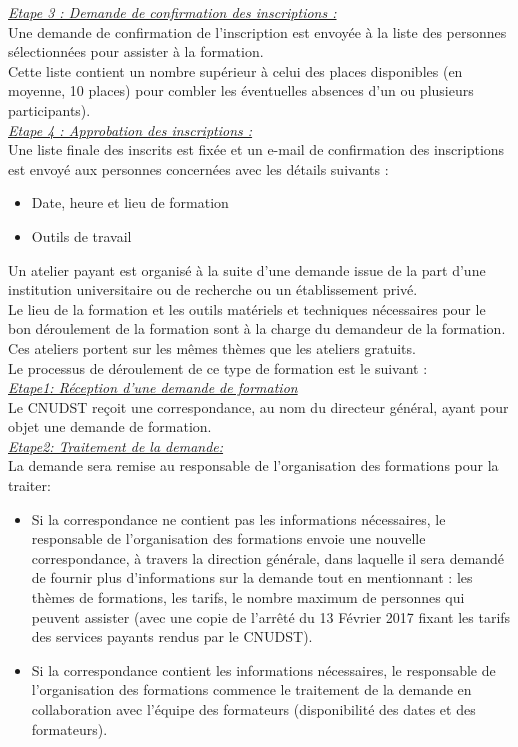 \underline{\textit{Etape 3 : Demande de confirmation des inscriptions :}}\\
Une demande de confirmation de l’inscription est envoyée à la liste des personnes
sélectionnées pour assister à la formation.\\
Cette liste contient un nombre
supérieur à celui des places disponibles (en moyenne, 10 places) pour combler les
éventuelles absences d’un ou plusieurs participants).\\
\underline{\textit{Etape 4 : Approbation des inscriptions :}}\\
Une liste finale des inscrits est fixée et un e-mail de confirmation des inscriptions
est envoyé aux personnes concernées avec les détails suivants :
\begin{itemize}
	\item Date, heure et lieu de formation
	\item Outils de travail
\end{itemize}
Un atelier payant est organisé à la suite d’une demande issue de la part d’une institution
universitaire ou de recherche ou un établissement privé.\\
Le lieu de la formation et les outils matériels et techniques nécessaires pour le bon
déroulement de la formation sont à la charge du demandeur de la formation.\\ Ces ateliers
portent sur les mêmes thèmes que les ateliers gratuits.\\
Le processus de déroulement de ce type de formation est le suivant :\\
\underline{\textit{Etape1: Réception d’une demande de formation}}\\
Le CNUDST reçoit une correspondance, au nom du directeur général,
ayant pour objet une demande de formation.\\
\underline{\textit{Etape2: Traitement de la demande:}}\\
La demande sera remise au responsable de l’organisation des formations pour la
traiter:
\begin{itemize}
	\item Si la correspondance ne contient pas les informations nécessaires, le responsable
	de l’organisation des formations envoie une nouvelle correspondance, à travers la
	direction générale, dans
	laquelle il sera demandé de fournir plus d’informations sur la demande tout en
	mentionnant : les thèmes de formations, les tarifs, le nombre maximum de
	personnes qui peuvent assister (avec une copie de l’arrêté du 13 Février 2017
	fixant les tarifs des services payants rendus par le CNUDST). 
	\item Si la correspondance contient les informations nécessaires, le responsable de
	l’organisation des formations commence le traitement de la demande en
	collaboration avec l’équipe des formateurs (disponibilité des dates et des
	formateurs).
\end{itemize}
